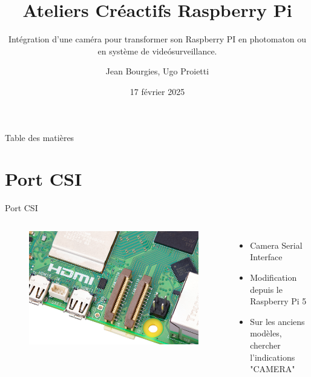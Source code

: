 \documentclass[aspectratio=169,xcolor=dvipsnames]{beamer}
\title{Ateliers Créactifs Raspberry Pi}
\subtitle{Intégration d'une caméra pour transformer son Raspberry PI en photomaton ou en système de videósurveillance.}
\author{Jean Bourgies, Ugo Proietti}
\date{17 février 2025}
\begin{document}
\begin{frame}
    \titlepage
\end{frame}

\begin{frame}{Table des matières}
    \tableofcontents
\end{frame}

\section{Port CSI}

\begin{frame}{Port CSI}
    \begin{columns}[c] %

        \begin{figure}
            \includegraphics[width=1\textwidth]{images/rpi-5-dsi-csi.jpg}
        \end{figure}

        \begin{itemize}
            \item Camera Serial Interface
            \item Modification depuis le Raspberry Pi 5
            \item Sur les anciens modèles, chercher l'indications "CAMERA"
        \end{itemize}

    \end{columns}
\end{frame}
\end{document}
